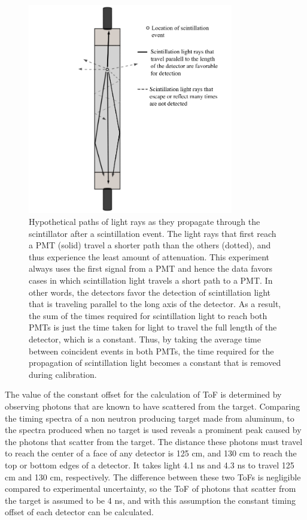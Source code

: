 \begin{figure}
    \centering
    \includegraphics[width = 0.8\textwidth]{Content/Methods/lightpaths.png}
    \caption{Hypothetical paths of light rays as they propagate through the scintillator after a scintillation event. The light rays that first reach a PMT (solid) travel a shorter path than the others (dotted), and thus experience the least amount of attenuation. This experiment always uses the first signal from a PMT and hence the data favors cases in which scintillation light travels a short path to a PMT. In other words, the detectors favor the detection of scintillation light that is traveling parallel to the long axis of the detector. As a result, the sum of the times required for scintillation light to reach both PMTs is just the time taken for light to travel the full length of the detector, which is a constant. Thus, by taking the average time between coincident events in both PMTs, the time required for the propagation of scintillation light becomes a constant that is removed during calibration. }
    \label{fig:lightpath}
\end{figure}

The value of the constant offset for the calculation of ToF is determined by observing photons that are known to have scattered from the target. Comparing the timing spectra of a non neutron producing target made from aluminum, to the spectra produced when no target is used reveals a prominent peak caused by the photons that scatter from the target. The distance these photons must travel to reach the center of a face of any detector is 125 cm, and 130 cm to reach the top or bottom edges of a detector. It takes light 4.1 ns and 4.3 ns to travel 125 cm and 130 cm, respectively. The difference between these two ToFs is negligible compared to experimental uncertainty, so the ToF of photons that scatter from the target is assumed to be 4 ns, and with this assumption the constant timing offset of each detector can be calculated.  
   
